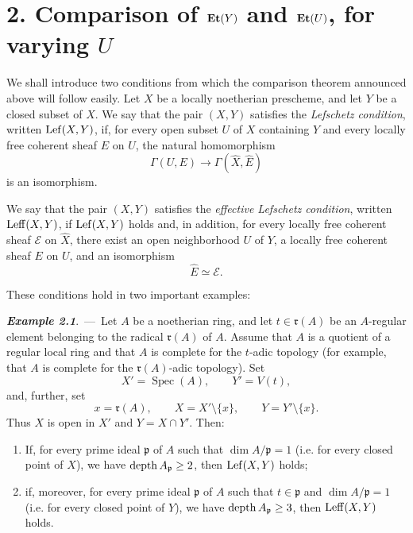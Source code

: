 \section*{2. Comparison of $\mathbf{Et}(Y)$ and $\mathbf{Et}(U)$, for varying $U$}

We shall introduce two conditions from which the comparison theorem announced
above will follow easily. Let $X$ be a locally noetherian prescheme, and let
$Y$ be a closed subset of $X$. We say that the pair $(X,Y)$ satisfies the
\emph{Lefschetz condition}, written $\operatorname{Lef}(X,Y)$, if, for every open subset
$U$ of $X$ containing $Y$ and every locally free coherent sheaf $E$ on $U$,
the natural homomorphism
\[
  \Gamma(U,E)\longrightarrow\Gamma(\widehat X,\widehat E)
\]
is an isomorphism.

We say that the pair $(X,Y)$ satisfies the \emph{effective Lefschetz
condition}, written $\operatorname{Leff}(X,Y)$, if $\operatorname{Lef}(X,Y)$ holds and, in addition,
for every locally free coherent sheaf $\mathcal E$ on $\widehat X$, there
exist an open neighborhood $U$ of $Y$, a locally free coherent sheaf $E$ on
$U$, and an isomorphism
\[
  \widehat E\simeq\mathcal E.
\]

These conditions hold in two important examples:

\medskip
{}\noindent\textbf{\textit{Example 2.1}}.\ ---\ 
Let $A$ be a noetherian ring, and let $t\in\mathfrak r(A)$ be an
$A$-regular element belonging to the radical $\mathfrak r(A)$ of $A$.
Assume that $A$ is a quotient of a regular local ring and that $A$ is
complete for the $t$-adic topology (for example, that $A$ is complete for
the $\mathfrak r(A)$-adic topology). Set
\[
  X'=\operatorname{Spec}(A),\qquad Y'=V(t),
\]
and, further, set
\[
  x=\mathfrak r(A),\qquad X=X'\setminus\{x\},\qquad
  Y=Y'\setminus\{x\}.
\]
Thus $X$ is open in $X'$ and $Y=X\cap Y'$. Then:

\begin{enumerate}[label=(\roman*),leftmargin=2.5em]
\item If, for every prime ideal $\mathfrak p$ of $A$ such that
$\dim A/\mathfrak p=1$ (i.e. for every closed point of $X$), we have
$\operatorname{depth} A_{\mathfrak p}\geq 2$, then $\operatorname{Lef}(X,Y)$ holds;

\item if, moreover, for every prime ideal $\mathfrak p$ of $A$ such that
$t\in\mathfrak p$ and $\dim A/\mathfrak p=1$ (i.e. for every closed point
of $Y$), we have $\operatorname{depth} A_{\mathfrak p}\geq 3$, then $\operatorname{Leff}(X,Y)$
holds.
\end{enumerate}

